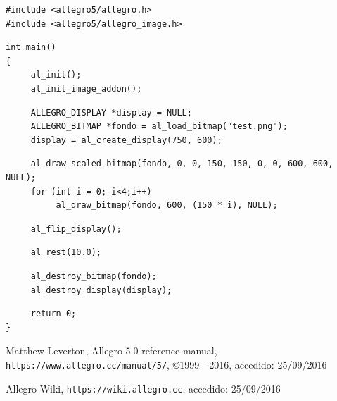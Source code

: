 \documentclass[11pt]{article}
\begin{document}
\begin{verbatim}
#include <allegro5/allegro.h>
#include <allegro5/allegro_image.h>
\end{verbatim}
\begin{verbatim}
int main() 
{
     al_init();
     al_init_image_addon();
\end{verbatim}
\begin{verbatim}
     ALLEGRO_DISPLAY *display = NULL;
     ALLEGRO_BITMAP *fondo = al_load_bitmap("test.png");
     display = al_create_display(750, 600);
\end{verbatim}
\begin{verbatim}
     al_draw_scaled_bitmap(fondo, 0, 0, 150, 150, 0, 0, 600, 600, NULL);
     for (int i = 0; i<4;i++)
          al_draw_bitmap(fondo, 600, (150 * i), NULL);
\end{verbatim}
\begin{verbatim}
     al_flip_display();
\end{verbatim}
\begin{verbatim}
     al_rest(10.0);
\end{verbatim}
\begin{verbatim}
     al_destroy_bitmap(fondo);
     al_destroy_display(display);
\end{verbatim}
\begin{verbatim}
     return 0;
}
\end{verbatim}
\vfill
\begin{thebibliography}{9}
     Matthew Leverton, 
     Allegro 5.0 reference manual, 
     \verb!https://www.allegro.cc/manual/5/!, 
     \copyright 1999 - 2016,
     accedido: 25/09/2016
     
     Allegro Wiki,
     \verb!https://wiki.allegro.cc!,
     accedido: 25/09/2016
\end{thebibliography}
\end{document}
